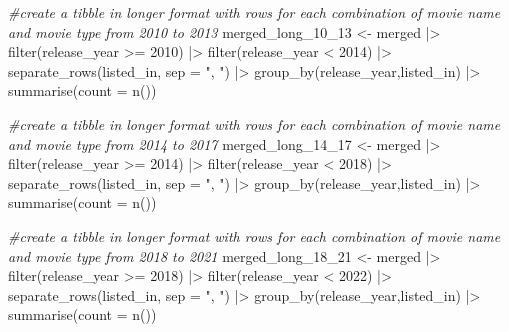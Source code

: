 \documentclass[
]{article}
\newenvironment{Shaded}{\begin{snugshade}}{\end{snugshade}}
\newcommand{\AttributeTok}[1]{\textcolor[rgb]{0.77,0.63,0.00}{#1}}
\newcommand{\CommentTok}[1]{\textcolor[rgb]{0.56,0.35,0.01}{\textit{#1}}}
\newcommand{\DecValTok}[1]{\textcolor[rgb]{0.00,0.00,0.81}{#1}}
\newcommand{\FunctionTok}[1]{\textcolor[rgb]{0.00,0.00,0.00}{#1}}
\newcommand{\NormalTok}[1]{#1}
\newcommand{\OtherTok}[1]{\textcolor[rgb]{0.56,0.35,0.01}{#1}}
\newcommand{\SpecialCharTok}[1]{\textcolor[rgb]{0.00,0.00,0.00}{#1}}
\newcommand{\StringTok}[1]{\textcolor[rgb]{0.31,0.60,0.02}{#1}}
\begin{document}
\begin{Shaded}
\begin{Highlighting}[]
\CommentTok{\#create a tibble in longer format with rows for each combination of movie name and movie type from 2010 to 2013}
\NormalTok{merged\_long\_10\_13 }\OtherTok{\textless{}{-}}\NormalTok{ merged }\SpecialCharTok{|\textgreater{}}
  \FunctionTok{filter}\NormalTok{(release\_year }\SpecialCharTok{\textgreater{}=} \DecValTok{2010}\NormalTok{) }\SpecialCharTok{|\textgreater{}}
  \FunctionTok{filter}\NormalTok{(release\_year }\SpecialCharTok{\textless{}} \DecValTok{2014}\NormalTok{) }\SpecialCharTok{|\textgreater{}}
  \FunctionTok{separate\_rows}\NormalTok{(listed\_in, }\AttributeTok{sep =} \StringTok{", "}\NormalTok{) }\SpecialCharTok{|\textgreater{}} 
  \FunctionTok{group\_by}\NormalTok{(release\_year,listed\_in) }\SpecialCharTok{|\textgreater{}} 
  \FunctionTok{summarise}\NormalTok{(}\AttributeTok{count =} \FunctionTok{n}\NormalTok{())}

\CommentTok{\#create a tibble in longer format with rows for each combination of movie name and movie type from 2014 to 2017}
\NormalTok{merged\_long\_14\_17 }\OtherTok{\textless{}{-}}\NormalTok{ merged }\SpecialCharTok{|\textgreater{}}
  \FunctionTok{filter}\NormalTok{(release\_year }\SpecialCharTok{\textgreater{}=} \DecValTok{2014}\NormalTok{) }\SpecialCharTok{|\textgreater{}}
  \FunctionTok{filter}\NormalTok{(release\_year }\SpecialCharTok{\textless{}} \DecValTok{2018}\NormalTok{) }\SpecialCharTok{|\textgreater{}}
  \FunctionTok{separate\_rows}\NormalTok{(listed\_in, }\AttributeTok{sep =} \StringTok{", "}\NormalTok{) }\SpecialCharTok{|\textgreater{}} 
  \FunctionTok{group\_by}\NormalTok{(release\_year,listed\_in) }\SpecialCharTok{|\textgreater{}} 
  \FunctionTok{summarise}\NormalTok{(}\AttributeTok{count =} \FunctionTok{n}\NormalTok{())}

\CommentTok{\#create a tibble in longer format with rows for each combination of movie name and movie type from 2018 to 2021}
\NormalTok{merged\_long\_18\_21 }\OtherTok{\textless{}{-}}\NormalTok{ merged }\SpecialCharTok{|\textgreater{}}
  \FunctionTok{filter}\NormalTok{(release\_year }\SpecialCharTok{\textgreater{}=} \DecValTok{2018}\NormalTok{) }\SpecialCharTok{|\textgreater{}}
  \FunctionTok{filter}\NormalTok{(release\_year }\SpecialCharTok{\textless{}} \DecValTok{2022}\NormalTok{) }\SpecialCharTok{|\textgreater{}}
  \FunctionTok{separate\_rows}\NormalTok{(listed\_in, }\AttributeTok{sep =} \StringTok{", "}\NormalTok{) }\SpecialCharTok{|\textgreater{}} 
  \FunctionTok{group\_by}\NormalTok{(release\_year,listed\_in) }\SpecialCharTok{|\textgreater{}} 
  \FunctionTok{summarise}\NormalTok{(}\AttributeTok{count =} \FunctionTok{n}\NormalTok{())}
\end{Highlighting}
\end{Shaded}
\end{document}
